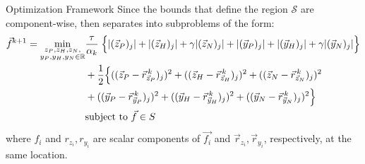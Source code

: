 \documentclass[10pt, t]{beamer}
\begin{document}
\begin{frame}{Optimization Framework}
	Since the bounds that define the region $\mathcal{S}$ are component-wise, then   separates into subproblems of the form: 
			\begin{equation} \label{scalarSubprob}
				\begin{aligned}
					\vec{f}^{k+1}= %
					\min_{\substack{z_P,z_H,z_N,\\ y_P,y_H,y_N \in \R}}
				    &\frac{\tau}{\alpha_k}\; \Big\{ 
					|(\zP)_j| + |(\zH)_j| + \gamma |(\zN)_j| %
					+	|(\yP)_j| + |(\yH)_j| + \gamma |(\yN)_j|\Big\} \\
					& + \frac{1}{2} \Big\{
					((\zP - \vec{r}_{\zP}^{\, k})_j)^2 + 
					((\zH - \vec{r}_{\zH}^{\, k})_j)^2 +
					((\zN - \vec{r}_{\zN}^{\, k})_j)^2 \\ & + 
					((\yP - \vec{r}_{\yP}^{\, k})_j)^2 + 
					((\yH - \vec{r}_{\yH}^{\, k})_j)^2 +
					((\yN - \vec{r}_{\yN}^{\, k})_j)^2 \Big\} \\
					& \text{subject to } \vec{f} \in S
				\end{aligned}
			\end{equation}
		where $f_i$ and $r_{z_i}, r_{y_i}$ %
		are scalar components of $\vec{f_i}$ and $\vec{r}_{z_i}, \vec{r}_{y_i}$, respectively, at the same location.  
\end{frame}
\end{document}
